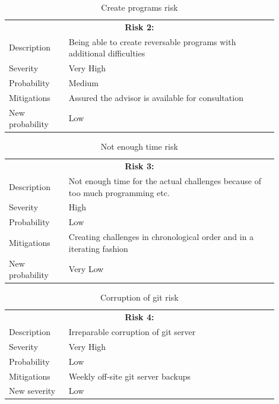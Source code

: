 \begin{table}
  \centering
  \begin{tabular}{|p{0.2\linewidth}p{0.7\linewidth}|}
    \hline
    \multicolumn{2}{|c|}{\textbf{Risk 2:}} \\
    Description     & Being able to create reversable programs with additional difficulties           \\
    Severity        & Very High                                 \\
    Probability     & Medium                                   \\
    Mitigations     & Assured the advisor is available for consultation  \\
    New probability & Low       \\
    \hline                            
  \end{tabular}
  \caption{Create programs risk}
\end{table}

\begin{table}
  \centering
  \begin{tabular}{|p{0.2\linewidth}p{0.7\linewidth}|}
    \hline
    \multicolumn{2}{|c|}{\textbf{Risk 3:}} \\
    Description            & Not enough time for the actual challenges because of too much programming etc.           \\
    Severity        & High                                 \\
    Probability     & Low                                   \\
    Mitigations     & Creating challenges in chronological order and in a iterating fashion  \\
    New probability & Very Low     \\
    \hline                              
  \end{tabular}
  \caption{Not enough time risk}
\end{table}

\newpage

\begin{table}
  \centering
  \begin{tabular}{|p{0.2\linewidth}p{0.7\linewidth}|}
    \hline
    \multicolumn{2}{|c|}{\textbf{Risk 4:}} \\
    Description     & Irreparable corruption of git server           \\
    Severity        & Very High                                 \\
    Probability     & Low                                   \\
    Mitigations     & Weekly off-site git server backups  \\
    New severity    & Low      \\
    \hline                             
  \end{tabular}
  \caption{Corruption of git risk}
\end{table}

